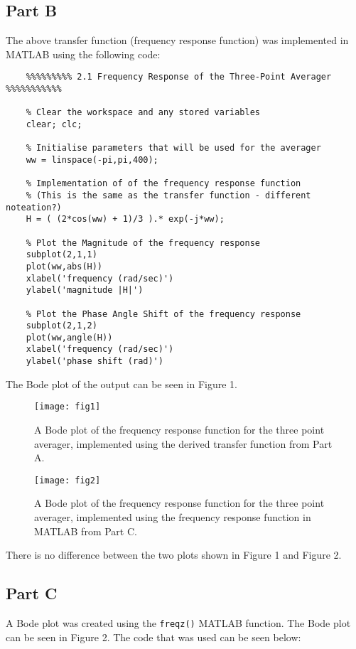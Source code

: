 \documentclass{article}
\begin{document}
\subsection{Part B}

The above transfer function (frequency response function) was implemented in MATLAB using the following code:

\begin{lstlisting}
	%%%%%%%%% 2.1 Frequency Response of the Three-Point Averager %%%%%%%%%%%
	
	% Clear the workspace and any stored variables
	clear; clc;
	
	% Initialise parameters that will be used for the averager
	ww = linspace(-pi,pi,400);
	
	% Implementation of of the frequency response function
	% (This is the same as the transfer function - different noteation?)
	H = ( (2*cos(ww) + 1)/3 ).* exp(-j*ww);
	
	% Plot the Magnitude of the frequency response
	subplot(2,1,1)
	plot(ww,abs(H))
	xlabel('frequency (rad/sec)')
	ylabel('magnitude |H|')
	
	% Plot the Phase Angle Shift of the frequency response
	subplot(2,1,2)
	plot(ww,angle(H))
	xlabel('frequency (rad/sec)')
	ylabel('phase shift (rad)')
\end{lstlisting}

The Bode plot of the output can be seen in Figure 1.

\begin{figure}[h]
	\centering
	\texttt{[image: fig1]}
	\caption{A Bode plot of the frequency response function for the three point averager, implemented using the derived transfer function from Part A.}
\end{figure}

\begin{figure}[h]
		\centering
		\texttt{[image: fig2]}
		\caption{A Bode plot of the frequency response function for the three point averager, implemented using the frequency response function in MATLAB from Part C.}
\end{figure}


There is no difference between the two plots shown in Figure 1 and Figure 2.

\subsection{Part C}

A Bode plot was created using the \verb|freqz()| MATLAB function. The Bode plot can be seen in Figure 2. The code that was used can be seen below:
\end{document}
